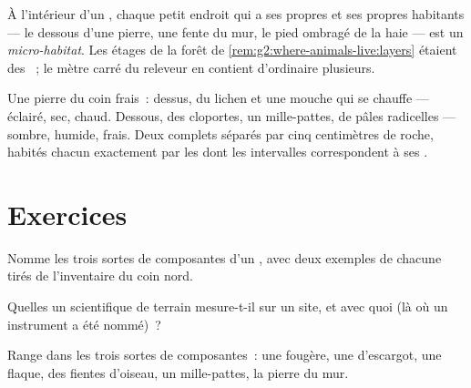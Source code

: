 \begin{definition}\label{def:g6:exploring-our-environment:microhabitat}
À l'intérieur d'un , chaque petit endroit qui a ses
propres  et ses propres habitants --- le dessous d'une
pierre, une fente du mur, le pied ombragé de la haie --- est un
\emph{micro-habitat}. Les étages de la forêt de
\cref{rem:g2:where-animals-live:layers} étaient des
~; le mètre carré du releveur en contient d'ordinaire
plusieurs.
\end{definition}

\begin{example}\label{ex:g6:exploring-our-environment:stone}
Une pierre du coin frais~: dessus, du lichen et une mouche qui se
chauffe --- éclairé, sec, chaud. Dessous, des cloportes, un
mille-pattes, de pâles radicelles --- sombre, humide, frais. Deux
 complets séparés par cinq centimètres de roche,
habités chacun exactement par les  dont les intervalles
correspondent à ses .
\end{example}

\section{Exercices}

\begin{exercise}[$\star$]\label{exo:g6:exploring-our-environment:1}
Nomme les trois sortes de composantes d'un , avec deux
exemples de chacune tirés de l'inventaire du coin nord.
\end{exercise}

\begin{exercise}[$\star$]\label{exo:g6:exploring-our-environment:2}
Quelles  un scientifique de terrain mesure-t-il sur un
site, et avec quoi (là où un instrument a été nommé)~?
\end{exercise}

\begin{exercise}[$\star$]\label{exo:g6:exploring-our-environment:3}
Range dans les trois sortes de composantes~: une fougère, une
 d'escargot, une flaque, des fientes d'oiseau, un
mille-pattes, la pierre du mur.
\end{exercise}

